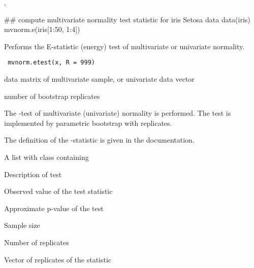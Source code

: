 \documentclass{article}
\begin{document}
\begin{SeeAlso}\relax
{}, 
\end{SeeAlso}
\begin{Examples}
\begin{ExampleCode}
 
 ## compute multivariate normality test statistic for iris Setosa data
 data(iris)
 mvnorm.e(iris[1:50, 1:4])
 \end{ExampleCode}
\end{Examples}

\begin{Description}\relax
Performs the E-statistic (energy) test of multivariate or univariate normality.
\end{Description}
\begin{Usage}
\begin{verbatim}
 mvnorm.etest(x, R = 999)
\end{verbatim}
\end{Usage}
\begin{Arguments}
\begin{ldescription}
\item[\code{x}] data matrix of multivariate sample, or univariate data vector
\item[\code{R}] number of bootstrap replicates 
\end{ldescription}
\end{Arguments}
\begin{Details}\relax
The -test of multivariate (univariate) normality
is performed. The test is implemented by parametric bootstrap with 
 replicates. 

The definition of the -statistic is given in the 
 documentation.\end{Details}
\begin{Value}
A list with class  containing
\begin{ldescription}
\item[\code{method}] Description of test
\item[\code{statistic}] Observed value of the test statistic
\item[\code{p.value}] Approximate p-value of the test
\item[\code{n}] Sample size
\item[\code{R}] Number of replicates
\item[\code{replicates}] Vector of replicates of the statistic
\end{ldescription}
\end{Value}
\end{document}
